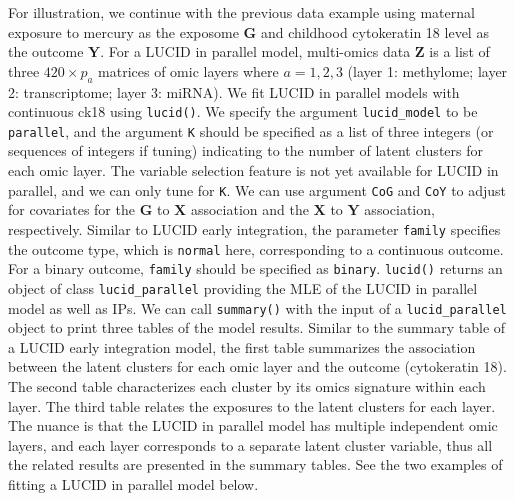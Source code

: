 For illustration, we continue with the previous data example using
maternal exposure to mercury as the exposome \(\boldsymbol{\mathbf{G}}\)
and childhood cytokeratin 18 level as the outcome
\(\boldsymbol{\mathbf{Y}}\). For a LUCID in parallel model, multi-omics
data \(\boldsymbol{\mathbf{Z}}\) is a list of three \(420 \times p_a\)
matrices of omic layers where \(a = 1, 2, 3\) (layer 1: methylome; layer
2: transcriptome; layer 3: miRNA). We fit LUCID in parallel models with
continuous ck18 using \texttt{lucid()}. We specify the argument
\texttt{lucid\textasciigrave{}\textasciigrave{}\_\textasciigrave{}\textasciigrave{}model} to be \texttt{parallel}, and the argument \texttt{K} should be
specified as a list of three integers (or sequences of integers if
tuning) indicating to the number of latent clusters for each omic layer.
The variable selection feature is not yet available for LUCID in
parallel, and we can only tune for \texttt{K}. We can use argument \texttt{CoG} and
\texttt{CoY} to adjust for covariates for the \(\boldsymbol{\mathbf{G}}\) to
\(\boldsymbol{\mathbf{X}}\) association and the \(\boldsymbol{\mathbf{X}}\)
to \(\boldsymbol{\mathbf{Y}}\) association, respectively. Similar to LUCID
early integration, the parameter \texttt{family} specifies the outcome type,
which is \texttt{normal} here, corresponding to a continuous outcome. For a
binary outcome, \texttt{family} should be specified as \texttt{binary}. \texttt{lucid()}
returns an object of class \texttt{lucid\textasciigrave{}\textasciigrave{}\_\textasciigrave{}\textasciigrave{}parallel} providing the MLE of the
LUCID in parallel model as well as IPs. We can call \texttt{summary()} with the
input of a \texttt{lucid\textasciigrave{}\textasciigrave{}\_\textasciigrave{}\textasciigrave{}parallel} object to print three tables of the
model results. Similar to the summary table of a LUCID early integration
model, the first table summarizes the association between the latent
clusters for each omic layer and the outcome (cytokeratin 18). The
second table characterizes each cluster by its omics signature within
each layer. The third table relates the exposures to the latent clusters
for each layer. The nuance is that the LUCID in parallel model has
multiple independent omic layers, and each layer corresponds to a
separate latent cluster variable, thus all the related results are
presented in the summary tables. See the two examples of fitting a LUCID
in parallel model below.


